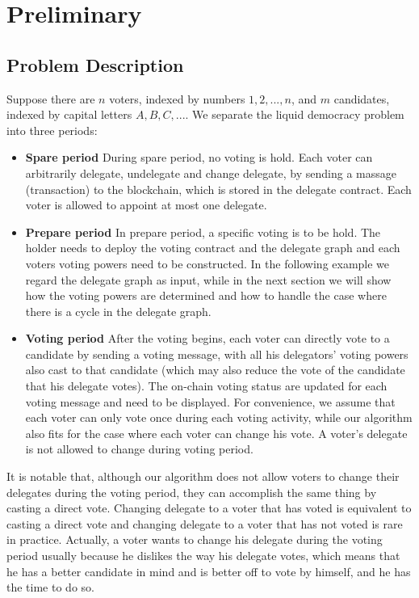 \section{Preliminary}
\subsection{Problem Description}
Suppose there are $n$ voters, indexed by numbers $1,2,...,n$, and $m$ candidates, indexed by capital letters $A,B,C,...$. We separate the liquid democracy  problem into three periods:
\begin{itemize}
	\item \textbf{Spare period} During spare period, no voting  is hold. Each voter can arbitrarily delegate, undelegate and change delegate, by sending a massage (transaction) to the blockchain, which is stored in the delegate contract. Each voter is allowed to appoint at most one delegate. 
	\item \textbf{Prepare period}
	In prepare period, a specific voting is to be hold. The holder needs to deploy the voting contract and the delegate graph and each voters voting powers need to be constructed. In the following example we regard the delegate graph as input,  while in the next section we will show how the voting powers are determined and how to handle the case where there is a cycle in the delegate graph. %
	\item \textbf{Voting period} After the voting begins, each voter can directly vote to a candidate by sending a voting message, with all his delegators' voting powers also cast to that candidate (which may also reduce the vote of the candidate that his delegate votes). The on-chain voting status are updated for each voting message and need to be displayed. For convenience, we assume that each voter can only vote once during each voting activity, while our algorithm also fits for the case where each voter can change his vote. A voter's delegate is not allowed to change during voting period.
\end{itemize}
It is notable that, although our algorithm does not allow voters to change their delegates during the voting period, they can accomplish the same thing by casting a direct vote.  Changing delegate to a voter that has voted is equivalent to casting a direct vote and changing delegate to a voter that has not voted is rare in practice. Actually, a voter wants to change his delegate during the voting period usually because  he dislikes the way his delegate votes, which means that he has a better candidate in mind and is better off to vote by himself, and he has the time to do so.

